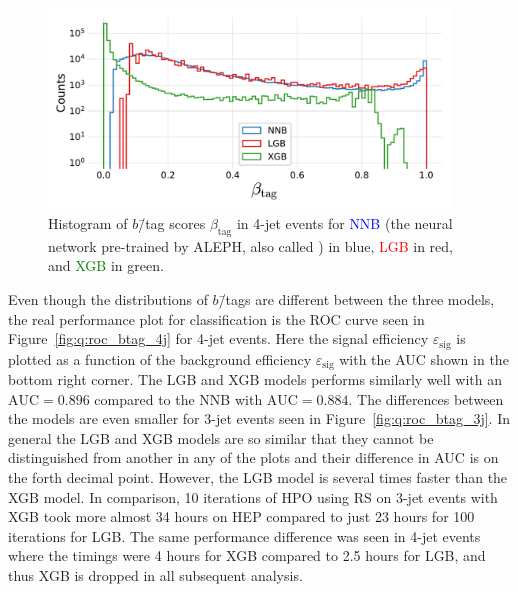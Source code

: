 \begin{figure}[h!]
  \centerfloat
  \includegraphics[width=0.95\textwidth, trim=0 0 0 30, clip]{figures/quarks/y_pred_4_jet_hist-down_sample=1.00-ML_vars=vertex-selection=b-ejet_min=4-n_iter_RS_lgb=99-n_iter_RS_xgb=9-cdot_cut=0.90-version=19.pdf}
  \caption[$b$\=/Tag Scores in 4-Jet Events]
          {Histogram of $b$\=/tag scores $\beta_\mathrm{tag}$ in 4-jet events for \textcolor{blue}{NNB} (the neural network pre-trained by ALEPH, also called ) in blue, \textcolor{red}{LGB} in red, and \textcolor{green}{XGB} in green. 
          } 
  \label{fig:q:btag_scores_4j}
\end{figure}

Even though the distributions of $b$\=/tags are different between the three models, the real performance plot for classification is the ROC curve seen in Figure~\ref{fig:q:roc_btag_4j} for 4-jet events. Here the signal efficiency $\varepsilon_\mathrm{sig}$ is plotted as a function of the background efficiency $\varepsilon_\mathrm{sig}$ with the AUC shown in the bottom right corner. The LGB and XGB models performs similarly well with an $\mathrm{AUC}=0.896$ compared to the NNB with $\mathrm{AUC}=0.884$. The differences between the models are even smaller for 3-jet events seen in Figure~\ref{fig:q:roc_btag_3j}. In general the LGB and XGB models are so similar that they cannot be distinguished from another in any of the plots and their difference in AUC is on the forth decimal point. \label{page:q:timings_b_tag}
However, the LGB model is several times faster than the XGB model. In comparison, \num{10} iterations of HPO using RS on 3-jet events with XGB took more almost \num{34} hours on HEP compared to just \num{23} hours for \num{100} iterations for LGB. The same performance difference was seen in 4-jet events where the timings were \num{4} hours for XGB compared to \num{2.5} hours for LGB, and thus XGB is dropped in all subsequent analysis. 

